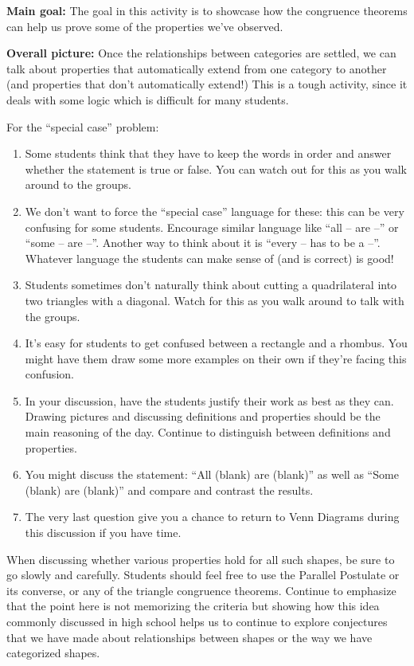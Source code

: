 \documentclass[nooutcomes,noauthor, handout]{ximera}
\begin{document}
\pagebreak

\begin{instructorNotes}
{\bf Main goal: } The goal in this activity is to showcase how the congruence theorems can help us prove some of the properties we've observed.


{\bf Overall picture:} Once the relationships between categories are settled, we can talk about properties that automatically extend from one category to another (and properties that don't automatically extend!)  This is a tough activity, since it deals with some logic which is difficult for many students.

For the ``special case'' problem:
\begin{enumerate}
\item Some students think that they have to keep the words in order and answer whether the statement is true or false.  You can watch out for this as you walk around to the groups.
\item We don't want to force the ``special case'' language for these: this can be very confusing for some students. Encourage similar language like ``all -- are --'' or ``some -- are --''. Another way to think about it is ``every -- has to be a --''. Whatever language the students can make sense of (and is correct) is good!
\item Students sometimes don't naturally think about cutting a quadrilateral into two triangles with a diagonal. Watch for this as you walk around to talk with the groups.
\item It's easy for students to get confused between a rectangle and a rhombus.  You might have them draw some more examples on their own if they're facing this confusion.
\item In your discussion, have the students justify their work as best as they can. Drawing pictures and discussing definitions and properties should be the main reasoning of the day. Continue to distinguish between definitions and properties.
\item You might discuss the statement: ``All (blank) are (blank)'' as well as ``Some (blank) are (blank)'' and compare and contrast the results.
\item The very last question give you a chance to return to Venn Diagrams during this discussion if you have time.
\end{enumerate}

When discussing whether various properties hold for all such shapes, be sure to go slowly and carefully. Students should feel free to use the Parallel Postulate or its converse, or any of the triangle congruence theorems. Continue to emphasize that the point here is not memorizing the criteria but showing how this idea commonly discussed in high school helps us to continue to explore conjectures that we have made about relationships between shapes or the way we have categorized shapes.


\end{instructorNotes}
\end{document}
